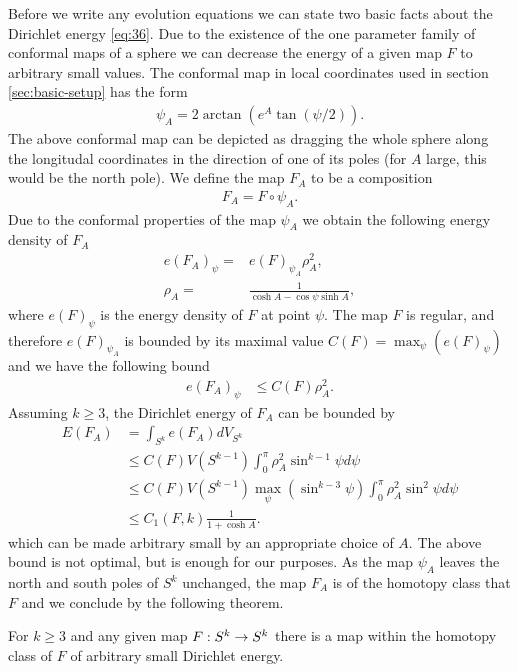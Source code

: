 Before we write any evolution equations we can state two basic facts
about the Dirichlet energy \eqref{eq:36}. Due to the existence of the
one parameter family of conformal maps of a sphere we can decrease the
energy of a given map $F$ to arbitrary small values. The conformal map
in local coordinates used in section \ref{sec:basic-setup} has the
form
\begin{align}
  \label{eq:10}
  \psi_A=2\arctan(e^A\tan(\psi/2)).
\end{align}
The above conformal map can be depicted as dragging the whole sphere
along the longitudal coordinates in the direction of one of its poles
(for $A$ large, this would be the north pole). We define the map $F_A$
to be a composition
\begin{align}
  \label{eq:11}
  F_A=F\circ\psi_A.
\end{align}
Due to the conformal properties of the map $\psi_A$ we obtain the
following energy density of $F_A$
\begin{align}
  \label{eq:12}
  e(F_A)_\psi=&e(F)_{\psi_A}\rho_A^2,\\
  \rho_A=&\frac{1}{\cosh A-\cos\psi\sinh A},
\end{align}
where $e(F)_\psi$ is the energy density of $F$ at point $\psi$.  The
map $F$ is regular, and therefore $e(F)_{\psi_A}$ is bounded by its
maximal value $C(F)=\max_\psi\left(e(F)_\psi\right)$ and we have the
following bound
\begin{align}
  \label{eq:13}
  e(F_A)_\psi&\le C(F)\rho_A^2.
\end{align}
Assuming $k\ge3$, the Dirichlet energy of $F_A$ can be bounded by
\begin{align}
  \label{eq:14}
  E(F_A)&=\int_{S^k}e(F_A)dV_{S^k}\\
  &\le C(F)V(S^{k-1})\int_{0}^{\pi}\rho_A^2\sin^{k-1}\psi d\psi\\
  &\le C(F)V(S^{k-1})\max_\psi(\sin^{k-3}\psi)\int_{0}^{\pi}\rho_A^2\sin^2\psi d\psi\\
  &\le C_1(F,k)\frac{1}{1+\cosh A}.
\end{align}
which can be made arbitrary small by an appropriate choice of $A$. The
above bound is not optimal, but is enough for our purposes. As the map
$\psi_A$ leaves the north and south poles of $S^k$ unchanged, the map
$F_A$ is of the homotopy class that $F$ and we conclude by the
following theorem.

\begin{theorem}\label{thm:skk-energy-bound}
  For $k\ge3$ and any given map $F:S^k\rightarrow S^k$ there is a map within
  the homotopy class of $F$ of arbitrary small Dirichlet energy.
\end{theorem}


